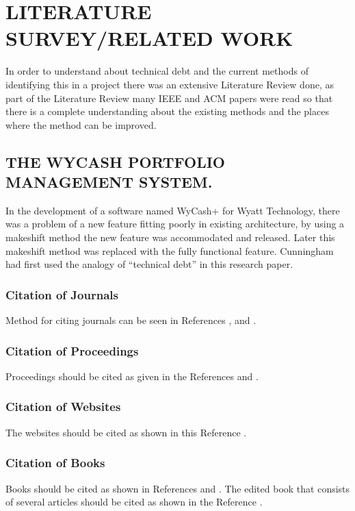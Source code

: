 
\chapter{\uppercase{Literature Survey/Related Work}} %
\label{ch:survey} %

In order to understand about technical debt and the current methods of identifying this in a project there was an extensive Literature Review done, as part of the Literature Review many IEEE and ACM papers were read so that there is a complete understanding about the existing methods and the places where the method can be improved.
\section{\uppercase{The WyCash portfolio management system.}}
In the development of a software named WyCash+ for Wyatt Technology, there was a problem of a new feature fitting poorly in existing architecture, by using a makeshift method the new feature was accommodated and released. Later this makeshift method was replaced with the fully functional feature. Cunningham had first used the analogy of “technical debt” in this research paper.
\subsection{Citation of Journals}
 Method for citing journals can be seen in References \cite{factors}, \cite{conley} and \cite{waldron}.
\subsection{Citation of Proceedings}
Proceedings should be cited as given in the References \cite{strips} and \cite{fan}.
\subsection{Citation of Websites}
The websites should be cited as shown in this Reference \cite{regulations}.\\

\subsection{Citation of Books}
Books should be cited as shown in References \cite{holt} and \cite{Aghion}. The edited book that consists of several articles should be cited as shown in the Reference \cite{riley}.
